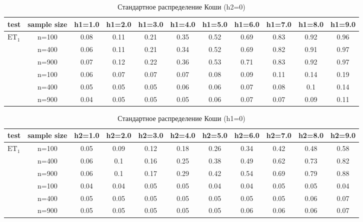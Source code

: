 \documentclass[12pt]{article}
\theoremstyle{break}
\begin{document}
\begin{table}[!h]
	\centering
	\caption{Стандартное распределение Коши (h2=0)}
	\begin{tabular}{l c c c c c c c c c c} 
		\toprule
		test & sample size & h1=1.0 & h1=2.0 & h1=3.0 & h1=4.0 & h1=5.0 & h1=6.0 & h1=7.0 & h1=8.0 & h1=9.0 \\ 
		\midrule
		\multirow{3}{*}{$\text{ET}_1$} 
		& n=100 & 0.08 & 0.11 & 0.21 & 0.35 & 0.52 & 0.69 & 0.83 & 0.92 & 0.96 \\ 
		& n=400 & 0.06 & 0.11 & 0.21 & 0.34 & 0.52 & 0.69 & 0.82 & 0.91 & 0.97 \\ 
		& n=900 & 0.07 & 0.12 & 0.22 & 0.36 & 0.53 & 0.71 & 0.83 & 0.92 & 0.97 \\ 
		\addlinespace
		\addlinespace
		\multirow{3}{*}{$\text{ET}_2$} 
		& n=100 & 0.06 & 0.07 & 0.07 & 0.07 & 0.08 & 0.09 & 0.11 & 0.14 & 0.19 \\ 
		& n=400 & 0.05 & 0.05 & 0.05 & 0.06 & 0.06 & 0.07 & 0.08 & 0.1 & 0.14 \\ 
		& n=900 & 0.04 & 0.05 & 0.05 & 0.05 & 0.06 & 0.07 & 0.07 & 0.09 & 0.11 \\ 
		\bottomrule
	\end{tabular}
	\label{tbl:et_comp_cauchy_h1}
\end{table}

\begin{table}[!h]
	\centering
	\caption{Стандартное распределение Коши (h1=0)}
	\begin{tabular}{l c c c c c c c c c c} 
		\toprule
		test & sample size & h2=1.0 & h2=2.0 & h2=3.0 & h2=4.0 & h2=5.0 & h2=6.0 & h2=7.0 & h2=8.0 & h2=9.0 \\ 
		\midrule
		\multirow{3}{*}{$\text{ET}_1$} 
		& n=100 & 0.05 & 0.09 & 0.12 & 0.18 & 0.26 & 0.34 & 0.42 & 0.48 & 0.58 \\ 
		& n=400 & 0.06 & 0.1 & 0.16 & 0.25 & 0.38 & 0.49 & 0.62 & 0.73 & 0.82 \\ 
		& n=900 & 0.06 & 0.1 & 0.17 & 0.29 & 0.42 & 0.54 & 0.69 & 0.79 & 0.88 \\ 
		\addlinespace
		\addlinespace
		\multirow{3}{*}{$\text{ET}_2$} 
		& n=100 & 0.04 & 0.04 & 0.05 & 0.05 & 0.04 & 0.04 & 0.05 & 0.05 & 0.04 \\ 
		& n=400 & 0.05 & 0.05 & 0.05 & 0.05 & 0.05 & 0.05 & 0.05 & 0.06 & 0.07 \\ 
		& n=900 & 0.05 & 0.05 & 0.05 & 0.05 & 0.05 & 0.06 & 0.06 & 0.06 & 0.07 \\ 
		\bottomrule
	\end{tabular}
	\label{tbl:et_comp_cauchy_h2}
\end{table}
\end{document}

